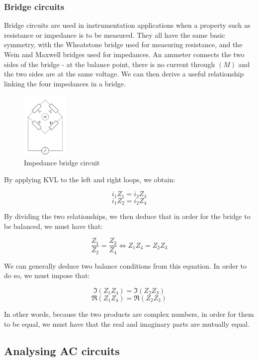 \documentclass{article}
\begin{document}
\subsubsection{Bridge circuits}

Bridge circuits are used in instrumentation applications when a property such as resistance or impedance is to be measured. They all have the same basic symmetry, with the Wheatstone bridge used for measuring resistance, and the Wein and Maxwell bridges used for impedances. An ammeter connects the two sides of the bridge - at the balance point, there is no current through $(M)$ and the two sides are at the same voltage. We can then derive a useful relationship linking the four impedances in a bridge.

\begin{figure}[h]
    \centering
    \includegraphics[width=0.2\textwidth]{images/bridge.png}
    \caption{Impedance bridge circuit}
    \label{fig:bridge}
\end{figure}

By applying KVL to the left and right loops, we obtain:

\[ i_1Z_1 = i_2Z_3 \]
\[ i_1Z_2 = i_2Z_4 \]

By dividing the two relationships, we then deduce that in order for the bridge to be balanced, we must have that:

\[ \frac{Z_1}{Z_2} = \frac{Z_3}{Z_4} \iff Z_1Z_4 = Z_2Z_3 \]

We can generally deduce two balance conditions from this equation. In order to do so, we must impose that:

\[ \Im{\left(Z_1Z_4\right)} = \Im{\left(Z_2Z_3\right)} \]
\[ \Re{\left(Z_1Z_4\right)} = \Re{\left(Z_2Z_3\right)} \]

In other words, because the two products are complex numbers, in order for them to be equal, we must have that the real and imaginary parts are mutually equal.

\newpage

\subsection{Analysing AC circuits}
\end{document}
